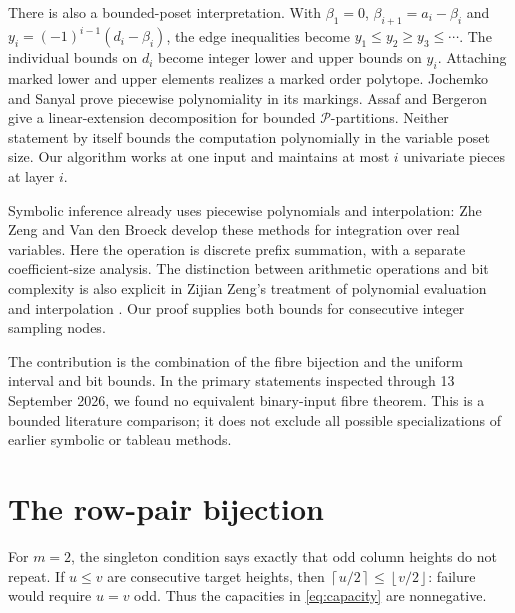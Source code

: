\documentclass[11pt]{article}
\theoremstyle{remark}
\begin{document}
There is also a bounded-poset interpretation. With
$\beta_1=0$, $\beta_{i+1}=a_i-\beta_i$ and
$y_i=(-1)^{i-1}(d_i-\beta_i)$, the edge inequalities become
$y_1\leq y_2\geq y_3\leq\cdots$. The individual bounds on $d_i$
become integer lower and upper bounds on $y_i$. Attaching marked lower
and upper elements realizes a marked order polytope.
Jochemko and Sanyal \cite[Theorem~2.6]{JS2014} prove piecewise
polynomiality in its markings. Assaf and Bergeron
\cite[Corollary~3.15]{AB2020} give a linear-extension decomposition
for bounded $\mathcal P$-partitions. Neither statement by itself bounds
the computation polynomially in the variable poset size. Our algorithm
works at one input and maintains at most $i$ univariate pieces at layer $i$.

Symbolic inference already uses piecewise polynomials and interpolation:
Zhe Zeng and Van den Broeck \cite[Sections~4.1--4.3]{ZVB2020} develop
these methods for integration over real variables. Here the operation is
discrete prefix summation, with a separate coefficient-size analysis.
The distinction between arithmetic operations and bit complexity is also
explicit in Zijian Zeng's treatment of polynomial evaluation and
interpolation \cite{Zeng2026}. Our proof supplies both
bounds for consecutive integer sampling nodes.

The contribution is the combination of the fibre bijection and the
uniform interval and bit bounds. In the primary statements inspected
through 13 September 2026, we found no equivalent binary-input fibre
theorem. This is a bounded literature comparison; it does not exclude
all possible specializations of earlier symbolic or tableau methods.

\section{The row-pair bijection}

For $m=2$, the singleton condition says exactly that odd column heights
do not repeat. If $u\leq v$ are consecutive target heights, then
$\left\lceil u/2\right\rceil\leq\left\lfloor v/2\right\rfloor$: failure would require $u=v$ odd.
Thus the capacities in \eqref{eq:capacity} are nonnegative.
\end{document}

